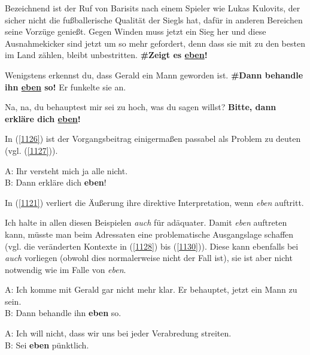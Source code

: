 {\begin{exe}
	\ex\label{1124} 
	\scriptsize
 	Bezeichnend ist der Ruf von Barisits nach einem Spieler wie Lukas Kulovits, der sicher nicht die fußballerische Qualität der Siegls hat, dafür in 			anderen Bereichen seine Vorzüge genießt. Gegen Winden muss jetzt ein Sieg her und diese Ausnahmekicker sind jetzt um so mehr gefordert, denn dass sie 		mit zu den besten im Land zählen, bleibt unbestritten. \textbf{\#Zeigt es \underline{eben}!}	
\end{exe}	

\begin{exe}
	\ex\label{1125} 
	\glqq Wenigstens erkennst du, dass Gerald ein Mann geworden ist. \textbf{\#Dann behandle ihn \underline{eben} so!}\grqq{} Er funkelte sie an.
\end{exe}	

\begin{exe}
	\ex\label{1126} 
	Na, na, du behauptest mir sei zu hoch, was du sagen willst? \textbf{Bitte, dann erkläre dich \underline{eben}!}
\end{exe}
In (\ref{1126}) ist der Vorgangsbeitrag einigermaßen passabel als Problem zu deuten (vgl. (\ref{1127})).

\begin{exe}
	\ex\label{1127} 
	A: Ihr versteht mich ja alle nicht.\\
	B: Dann erkläre dich \textbf{eben}!
\end{exe}
In (\ref{1121}) verliert die Äußerung ihre direktive Interpretation, wenn \textit{eben} auftritt. 
	
Ich halte in allen diesen Beispielen \textit{auch} für adäquater. Damit \textit{eben} auftreten kann, müsste man beim Adressaten eine problematische Ausgangslage schaffen (vgl. die veränderten Kontexte in (\ref{1128}) bis (\ref{1130})). Diese kann ebenfalls bei \textit{auch} vorliegen (obwohl dies normalerweise nicht der Fall ist), sie ist aber nicht notwendig wie im Falle von \textit{eben}.

\begin{exe}
	\ex\label{1128} 
	A: Ich komme mit Gerald gar nicht mehr klar. Er behauptet, jetzt ein Mann zu sein. \\
	B: Dann behandle ihn \textbf{eben} so.
\end{exe}

\begin{exe}
	\ex\label{1129} 
	A: Ich will nicht, dass wir uns bei jeder Verabredung streiten.\\
	B: Sei \textbf{eben} pünktlich.
\end{exe}
		
}
